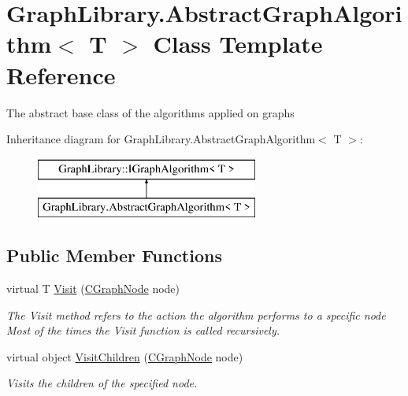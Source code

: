 \hypertarget{class_graph_library_1_1_abstract_graph_algorithm}{}\section{Graph\+Library.\+Abstract\+Graph\+Algorithm$<$ T $>$ Class Template Reference}
\label{class_graph_library_1_1_abstract_graph_algorithm}


The abstract base class of the algorithms applied on graphs  


Inheritance diagram for Graph\+Library.\+Abstract\+Graph\+Algorithm$<$ T $>$\+:\begin{figure}[H]
\begin{center}
\leavevmode
\includegraphics[height=2.000000cm]{class_graph_library_1_1_abstract_graph_algorithm}
\end{center}
\end{figure}
\subsection*{Public Member Functions}
\begin{DoxyCompactItemize}
\item 
virtual T \hyperlink{class_graph_library_1_1_abstract_graph_algorithm_af0a50489383c3191e9a02cb6d8a6731d}{Visit} (\hyperlink{class_graph_library_1_1_c_graph_node}{C\+Graph\+Node} node)
\begin{DoxyCompactList}\small\item\em The Visit method refers to the action the algorithm performs to a specific node Most of the times the Visit function is called recursively. \end{DoxyCompactList}\item 
virtual object \hyperlink{class_graph_library_1_1_abstract_graph_algorithm_a8a3fe9faaa81fd775a1800e18ef3b1cd}{Visit\+Children} (\hyperlink{class_graph_library_1_1_c_graph_node}{C\+Graph\+Node} node)
\begin{DoxyCompactList}\small\item\em Visits the children of the specified node. \end{DoxyCompactList}\end{DoxyCompactItemize}


